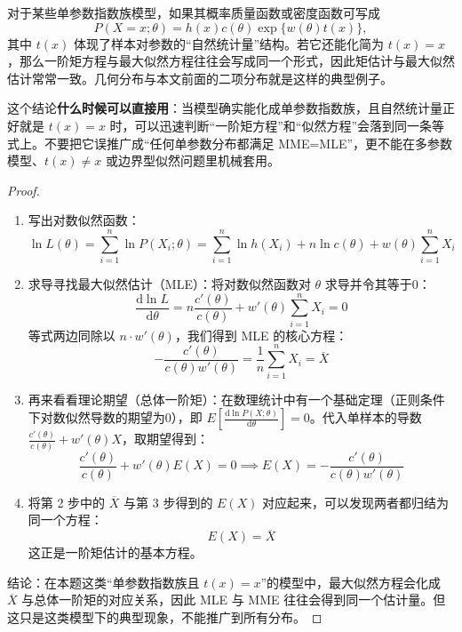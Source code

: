 ﻿\documentclass[lang=cn,11pt]{elegantbook}
\begin{document}
\begin{proposition}\label{prop:mle-mme-equiv} 
    对于某些单参数指数族模型，如果其概率质量函数或密度函数可写成
    \[
    P(X=x; \theta)=h(x)c(\theta)\exp\{w(\theta)t(x)\},
    \]
    其中 \(t(x)\) 体现了样本对参数的“自然统计量”结构。若它还能化简为 \(t(x)=x\)，那么一阶矩方程与最大似然方程往往会写成同一个形式，因此矩估计与最大似然估计常常一致。几何分布与本文前面的二项分布就是这样的典型例子。
\end{proposition}
\begin{note}
这个结论\textbf{什么时候可以直接用}：当模型确实能化成单参数指数族，且自然统计量正好就是 \(t(x)=x\) 时，可以迅速判断“一阶矩方程”和“似然方程”会落到同一条等式上。不要把它误推广成“任何单参数分布都满足 MME=MLE”，更不能在多参数模型、\(t(x)\neq x\) 或边界型似然问题里机械套用。
\end{note}
\begin{proof}
\begin{enumerate}
    \item 写出对数似然函数：$$\ln L(\theta) = \sum_{i=1}^n \ln P(X_i; \theta) = \sum_{i=1}^n \ln h(X_i) + n\ln c(\theta) + w(\theta)\sum_{i=1}^n X_i$$
    \item 求导寻找最大似然估计（MLE）：将对数似然函数对 $\theta$ 求导并令其等于0：$$\frac{\mathrm{d}\ln L}{\mathrm{d}\theta} = n\frac{c'(\theta)}{c(\theta)} + w'(\theta)\sum_{i=1}^n X_i = 0$$等式两边同除以 $n \cdot w'(\theta)$，我们得到 MLE 的核心方程：$$-\frac{c'(\theta)}{c(\theta)w'(\theta)} = \frac{1}{n}\sum_{i=1}^n X_i = \overline{X}$$
    \item 再来看看理论期望（总体一阶矩）：在数理统计中有一个基础定理（正则条件下对数似然导数的期望为0），即 $E\left[ \frac{\mathrm{d}\ln P(X; \theta)}{\mathrm{d}\theta} \right] = 0$。代入单样本的导数 $\frac{c'(\theta)}{c(\theta)} + w'(\theta)X$，取期望得到：$$\frac{c'(\theta)}{c(\theta)} + w'(\theta)E(X) = 0 \implies E(X) = -\frac{c'(\theta)}{c(\theta)w'(\theta)}$$
    \item 将第 2 步中的 \(\overline{X}\) 与第 3 步得到的 \(E(X)\) 对应起来，可以发现两者都归结为同一个方程：$$E(X)=\overline{X}$$这正是一阶矩估计的基本方程。
\end{enumerate}
结论：在本题这类“单参数指数族且 \(t(x)=x\)”的模型中，最大似然方程会化成 \(\overline{X}\) 与总体一阶矩的对应关系，因此 MLE 与 MME 往往会得到同一个估计量。但这只是这类模型下的典型现象，不能推广到所有分布。
\end{proof}
\end{document}
